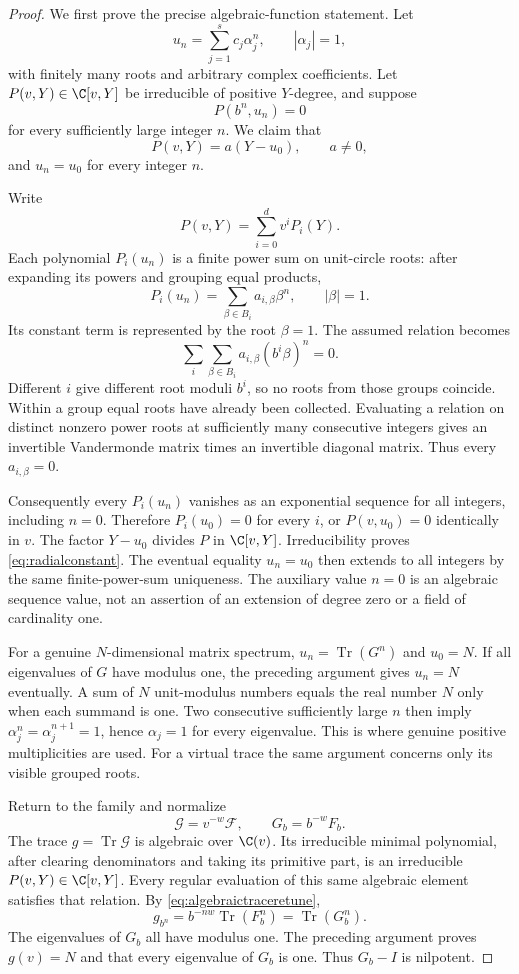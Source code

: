 \begin{proof}
We first prove the precise algebraic-function statement.
Let
\[
 u_n=\sum_{j=1}^s c_j\alpha_j^n,\qquad |\alpha_j|=1,
\]
with finitely many roots and arbitrary complex coefficients.
Let $P(v,Y)\in\C[v,Y]$ be irreducible of positive
$Y$-degree, and suppose
\[
 P(b^n,u_n)=0
\]
for every sufficiently large integer $n$.
We claim that
\begin{equation}\label{eq:radialconstant}
 P(v,Y)=a(Y-u_0),\qquad a\ne0,
\end{equation}
and $u_n=u_0$ for every integer $n$.

Write
\[
 P(v,Y)=\sum_{i=0}^d v^iP_i(Y).
\]
Each polynomial $P_i(u_n)$ is a finite power sum on
unit-circle roots: after expanding its powers and grouping
equal products,
\[
 P_i(u_n)=\sum_{\beta\in B_i} a_{i,\beta}\beta^n,
 \qquad |\beta|=1.
\]
Its constant term is represented by the root $\beta=1$.
The assumed relation becomes
\[
 \sum_i\sum_{\beta\in B_i}
       a_{i,\beta}(b^i\beta)^n=0.
\]
Different $i$ give different root moduli $b^i$, so no
roots from those groups coincide.
Within a group equal roots have already been collected.
Evaluating a relation on distinct nonzero power roots
at sufficiently many consecutive integers gives an
invertible Vandermonde matrix times an invertible
diagonal matrix. Thus every $a_{i,\beta}=0$.

Consequently every $P_i(u_n)$ vanishes as an exponential
sequence for all integers, including $n=0$.
Therefore $P_i(u_0)=0$ for every $i$, or
$P(v,u_0)=0$ identically in $v$.
The factor $Y-u_0$ divides $P$ in $\C[v,Y]$.
Irreducibility proves \eqref{eq:radialconstant}.
The eventual equality $u_n=u_0$ then extends to all
integers by the same finite-power-sum uniqueness.
The auxiliary value $n=0$ is an algebraic sequence value,
not an assertion of an extension of degree zero or a
field of cardinality one.

For a genuine $N$-dimensional matrix spectrum,
$u_n=\operatorname{Tr}(G^n)$ and $u_0=N$.
If all eigenvalues of $G$ have modulus one, the preceding
argument gives $u_n=N$ eventually.
A sum of $N$ unit-modulus numbers equals the real number
$N$ only when each summand is one.
Two consecutive sufficiently large $n$ then imply
$\alpha_j^n=\alpha_j^{n+1}=1$, hence $\alpha_j=1$
for every eigenvalue.
This is where genuine positive multiplicities are used.
For a virtual trace the same argument concerns only
its visible grouped roots.

Return to the family and normalize
\[
 \mathcal G=v^{-w}\mathcal F,\qquad G_b=b^{-w}F_b.
\]
The trace $g=\operatorname{Tr}\mathcal G$ is algebraic
over $\C(v)$. Its irreducible minimal polynomial,
after clearing denominators and taking its primitive
part, is an irreducible $P(v,Y)\in\C[v,Y]$.
Every regular evaluation of this same algebraic element
satisfies that relation.
By \eqref{eq:algebraictraceretune},
\[
 g_{b^n}
 =b^{-nw}\operatorname{Tr}(F_b^n)
 =\operatorname{Tr}(G_b^n).
\]
The eigenvalues of $G_b$ all have modulus one.
The preceding argument proves $g(v)=N$ and that every
eigenvalue of $G_b$ is one. Thus $G_b-I$ is nilpotent.


\end{proof}
